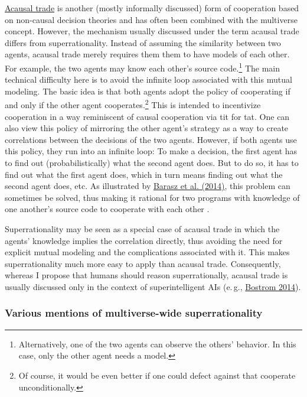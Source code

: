 \href{https://wiki.lesswrong.com/wiki/Acausal_trade}{Acausal
trade} is another (mostly informally discussed) form of cooperation
based on non-causal decision theories and has often been combined with
the multiverse concept. However, the mechanism usually discussed under
the term acausal trade differs from superrationality. Instead of
assuming the similarity between two agents, acausal trade merely
requires them them to have models of each other. For example, the two
agents may know each other's source code.\footnote{Alternatively, one of
  the two agents can observe the others' behavior. In this case, only
  the other agent needs a model.} The main technical difficulty here is
to avoid the infinite loop associated with this mutual modeling. The
basic idea is that both agents adopt the policy of cooperating if and
only if the other agent cooperates.\footnote{Of course, it would be even
better if one could defect against that cooperate unconditionally.} This is
intended to incentivize
cooperation in a way reminiscent of causal cooperation via tit for tat.
One can also view this policy of mirroring the other agent's strategy as
a way to create correlations between the decisions of the two agents. 
However, if both agents use this policy, they run into an infinite loop:
To make a decision, the first agent has to find out (probabilistically)
what the second agent does. But to do so, it has to find out what the
first agent does, which in turn means finding out what the second agent
does, etc. As illustrated by
\href{https://arxiv.org/abs/1401.5577}{Barasz et al. (2014)},
this problem can sometimes be solved, thus making it rational for two
programs with knowledge of one another's source code to cooperate with
each other \parencite[cf.][]{LaVictoire2014-sv,Critch2016-cx}.

Superrationality may be seen as a special case of acausal trade in which
the agents' knowledge implies the correlation directly, thus avoiding
the need for explicit mutual modeling and the complications associated
with it. This makes superrationality much more easy to apply than
acausal trade. Consequently, whereas I propose that humans should reason
superrationally, acausal trade is usually discussed only in the context
of superintelligent AIs (e.\,g.,
\href{http://www.nickbostrom.com/papers/porosity.pdf}{Bostrom
2014}).

\subsubsection{Various mentions of multiverse-wide
superrationality}\label{various-mentions-of-multiverse-wide-superrationality}

